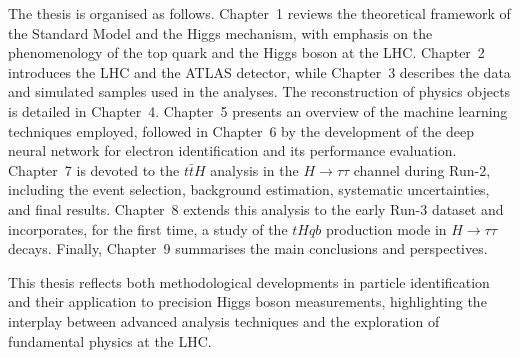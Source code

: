 The thesis is organised as follows. Chapter~1 reviews the theoretical framework of the Standard Model and the Higgs mechanism, with emphasis on the phenomenology of the top quark and the Higgs boson at the LHC. Chapter~2 introduces the LHC and the ATLAS detector, while Chapter~3 describes the data and simulated samples used in the analyses. The reconstruction of physics objects is detailed in Chapter~4. Chapter~5 presents an overview of the machine learning techniques employed, followed in Chapter~6 by the development of the deep neural network for electron identification and its performance evaluation. Chapter~7 is devoted to the $t\bar{t}H$ analysis in the $H\to\tau\tau$ channel during Run-2, including the event selection, background estimation, systematic uncertainties, and final results. Chapter~8 extends this analysis to the early Run-3 dataset and incorporates, for the first time, a study of the $tHqb$ production mode in $H \to \tau\tau$ decays. Finally, Chapter~9 summarises the main conclusions and perspectives.

This thesis reflects both methodological developments in particle identification and their application to precision Higgs boson measurements, highlighting the interplay between advanced analysis techniques and the exploration of fundamental physics at the LHC.
